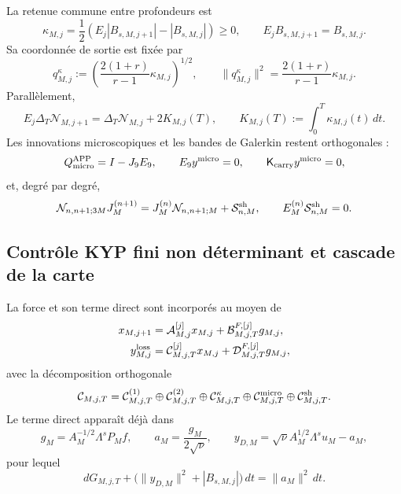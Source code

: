 La retenue commune entre profondeurs est
\begin{equation}
 \kappa_{M,j}
 =\frac12\left(E_j|B_{s,M,j+1}|-|B_{s,M,j}|\right)\ge0,
 \qquad
 E_jB_{s,M,j+1}=B_{s,M,j}.
 \label{eq:ns-import-carry}
\end{equation}
Sa coordonnée de sortie est fixée par
\begin{equation}
 q_{M,j}^{\kappa}
 :=\left(\frac{2(1+r)}{r-1}\kappa_{M,j}\right)^{1/2},
 \qquad
 \|q_{M,j}^{\kappa}\|^2
 =\frac{2(1+r)}{r-1}\kappa_{M,j}.
 \label{eq:ns-import-carry-port}
\end{equation}
Parallèlement,
\begin{equation}
 E_j\Delta_T\mathcal N_{M,j+1}
 =\Delta_T\mathcal N_{M,j}+2K_{M,j}(T),
 \qquad
 K_{M,j}(T):=\int_0^T\kappa_{M,j}(t)\,dt.
 \label{eq:ns-import-carry-telescope}
\end{equation}
Les innovations microscopiques et les bandes de Galerkin restent orthogonales :
\begin{equation}
 Q_{\rm micro}^{\rm APP}=I-J_9E_9,
 \qquad E_9y^{\rm micro}=0,
 \qquad \mathsf K_{\rm carry}y^{\rm micro}=0,
 \label{eq:ns-import-micro}
\end{equation}
et, degré par degré,
\begin{equation}
 \mathcal N_{n,n+1;3M}J_M^{(n+1)}
 =J_M^{(n)}\mathcal N_{n,n+1;M}
 +\mathcal S_{n,M}^{\rm sh},
 \qquad
 E_M^{(n)}\mathcal S_{n,M}^{\rm sh}=0.
 \label{eq:ns-import-shell}
\end{equation}

\subsection{Contrôle KYP fini non déterminant et cascade de la carte}

La force et son terme direct sont incorporés au moyen de
\begin{equation}
 \begin{aligned}
 x_{M,j+1}
 &=\mathcal A_{M,j}^{[j]}x_{M,j}
   +\mathcal B_{M,j,T}^{F,[j]}g_{M,j},\\
 y_{M,j}^{\rm loss}
 &=\mathcal C_{M,j,T}^{[j]}x_{M,j}
   +\mathcal D_{M,j,T}^{F,[j]}g_{M,j},
 \end{aligned}
 \label{eq:ns-import-affine-step}
\end{equation}
avec la décomposition orthogonale
\begin{equation}
 \mathcal C_{M,j,T}
 =\mathcal C_{M,j,T}^{(1)}
 \oplus\mathcal C_{M,j,T}^{(2)}
 \oplus\mathcal C_{M,j,T}^{\kappa}
 \oplus\mathcal C_{M,j,T}^{\rm micro}
 \oplus\mathcal C_{M,j,T}^{\rm sh}.
 \label{eq:ns-import-loss-decomposition}
\end{equation}
Le terme direct apparaît déjà dans
\[
 g_M=A_M^{-1/2}\Lambda^sP_Mf,
 \qquad
 a_M=\frac{g_M}{2\sqrt\nu},
 \qquad
 y_{D,M}=\sqrt\nu A_M^{1/2}\Lambda^su_M-a_M,
\]
pour lequel
\begin{equation}
 dG_{M,j,T}
 +\bigl(\|y_{D,M}\|^2+|B_{s,M,j}|\bigr)\,dt
 =\|a_M\|^2\,dt.
 \label{eq:ns-import-force-feedthrough}
\end{equation}

